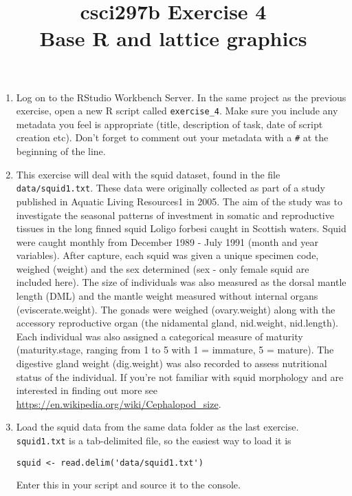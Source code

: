 \documentclass[12pt]{article}
\title{csci297b Exercise 4\\Base R and lattice graphics
  }
\date{}
\begin{document}
\maketitle

\begin{enumerate}

\centerline{\bf Part 1}

\item Log on to the RStudio Workbench Server. 
In the same project as the previous exercise, open a new R script called 
\verb|exercise_4|.
Make sure you include any metadata you feel is appropriate (title, description of task, date of script creation etc). Don’t forget to comment out your metadata with a \lstinline{#} at the beginning of the line.


 
\item  This exercise will deal with the squid dataset, found in the file \verb|data/squid1.txt|.
 These data were originally collected as part of a study published in Aquatic Living Resources1 in 2005. The aim of the study was to investigate the seasonal patterns of investment in somatic and reproductive tissues in the long finned squid Loligo forbesi caught in Scottish waters. Squid were caught monthly from December 1989 - July 1991 (month and year variables). After capture, each squid was given a unique specimen code, weighed (weight) and the sex determined (sex - only female squid are included here). The size of individuals was also measured as the dorsal mantle length (DML) and the mantle weight measured without internal organs (eviscerate.weight). The gonads were weighed (ovary.weight) along with the accessory reproductive organ (the nidamental gland, nid.weight, nid.length). Each individual was also assigned a categorical measure of maturity (maturity.stage, ranging from 1 to 5 with 1 = immature, 5 = mature). The digestive gland weight (dig.weight) was also recorded to assess nutritional status of the individual. If you’re not familiar with squid morphology and are interested in finding out more see 
\url{https://en.wikipedia.org/wiki/Cephalopod_size}.

 
\item Load the squid data from the same data folder as the last exercise.  \verb|squid1.txt|
is a tab-delimited file, so the easiest way to load it is
\begin{lstlisting}
squid <- read.delim('data/squid1.txt')
\end{lstlisting}
Enter this in your script and source it to the console.
 

\end{enumerate}
\end{document}
